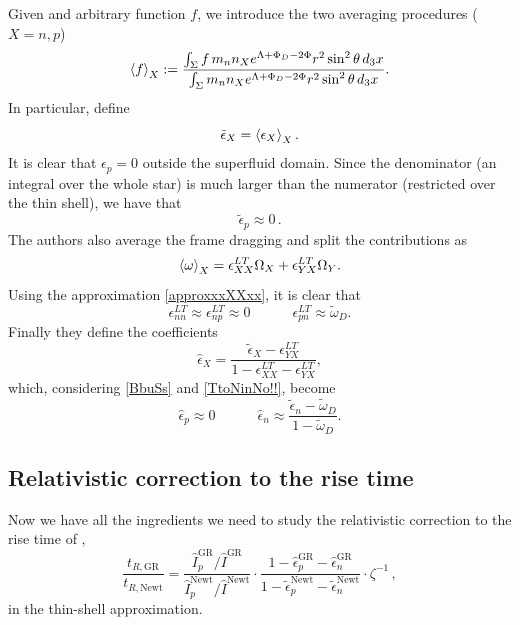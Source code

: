\documentclass[usenatbib%
]{mnras}
\newcommand{\spc}{\quad \quad \quad}
\begin{document}
Given and arbitrary function $f$, we introduce the two averaging procedures ($X=n,p$)
\begin{equation}\label{Avvocato}
\braket{f}_X := \dfrac{\int_\Sigma f \, m_n n_X e^{\Lambda +\Phi_D -2\Phi } r^2 \sin^2 \theta \, d_3 x}{\int_\Sigma m_n n_X e^{\Lambda +\Phi_D -2\Phi } r^2 \sin^2 \theta \, d_3 x}.
\end{equation}
In particular,  \cite{sourie_glitch2017}  define
\begin{equation}
\tilde{\epsilon}_X = \braket{\epsilon_X}_X .
\end{equation}
It is clear that $\epsilon_p = 0$ outside the superfluid domain. Since the denominator (an integral over the whole star) is much larger than the numerator (restricted over the thin shell), we have that
\begin{equation}\label{BbuSs}
\tilde{\epsilon}_p \approx 0 \, .
\end{equation}
The authors also average the frame dragging and split the contributions as 
\begin{equation}
\braket{\omega}_X = \epsilon^{LT}_{XX} \Omega_X + \epsilon^{LT}_{YX} \Omega_Y.
\end{equation}
Using the approximation \eqref{approxxxXXxx}, it is clear that
\begin{equation}\label{TtoNinNo!!}
\epsilon^{LT}_{nn} \approx \epsilon^{LT}_{np} \approx 0  \spc  \epsilon^{LT}_{pn} \approx \tilde{\omega}_D.
\end{equation}
Finally they define the coefficients
\begin{equation}
\hat{\epsilon}_X = \dfrac{\tilde{\epsilon}_X - \epsilon^{LT}_{YX}}{1-\epsilon^{LT}_{XX}-\epsilon^{LT}_{YX}},
\end{equation}
which, considering \eqref{BbuSs} and \eqref{TtoNinNo!!}, become
\begin{equation}\label{cestinare}
\hat{\epsilon}_p \approx 0   \spc  \hat{\epsilon}_n \approx \dfrac{\tilde{\epsilon}_n -\tilde{\omega}_D}{1-\tilde{\omega}_D}.
\end{equation}

\subsection{Relativistic correction to the rise time}

Now we have all the ingredients we need to study the relativistic correction to the rise time of \cite{sourie_glitch2017}, 
\begin{equation}\label{cometichiami}
\dfrac{t_{R,\textrm{GR}}}{t_{R,\textrm{Newt}}} = \dfrac{\hat{I}_p^{\textrm{GR}}/\hat{I}^{\textrm{GR}}}{\hat{I}_p^{\textrm{Newt}}/\hat{I}^{\textrm{Newt}}} \cdot \dfrac{1-\hat{\epsilon}_p^{\textrm{GR}}-\hat{\epsilon}_n^{\textrm{GR}}}{1-\tilde{\epsilon}_p^{\textrm{Newt}}-\tilde{\epsilon}_n^{\textrm{Newt}}} \cdot \zeta^{-1} \, ,
\end{equation}
in the thin-shell approximation. 
\end{document}
